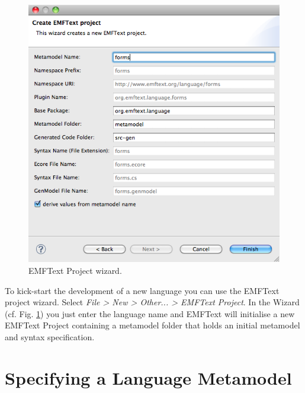 	\begin{figure}[ht]
	\centering
		\includegraphics[scale=0.5]{figures/wizard}
	\caption{EMFText Project wizard.}
	\label{fig:wizard}
	\end{figure}

	

	To kick-start the development of a new language you can use the EMFText project
	wizard. Select \emph{File > New > Other... > EMFText Project}. In the Wizard
	(cf. Fig. \ref{fig:wizard}) you just enter the language name and EMFText
	will initialise a new EMFText Project containing a metamodel folder that
	holds an initial metamodel and syntax specification.

\section{Specifying a Language Metamodel}

